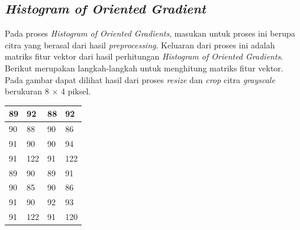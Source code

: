 \subsection{\textit{Histogram of Oriented Gradient}}
\noindent Pada proses \textit{Histogram of Oriented Gradients}, masukan untuk proses ini berupa citra yang berasal dari hasil \textit{preprocessing}. Keluaran dari proses ini adalah matriks fitur vektor dari hasil perhitungan \textit{Histogram of Oriented Gradients}. Berikut merupakan langkah-langkah untuk menghitung matriks fitur vektor. Pada gambar dapat dilihat hasil dari proses \textit{resize} dan \textit{crop} citra \textit{grayscale} berukuran 8 $\times$ 4 piksel.

\begin{table}[H]
	\centering
	\begin{small}
		\begin{tabular}{|p{2cm}|p{2cm}|p{2cm}|p{2cm}|}
			\hline
			89 & 92 & 88 & 92 \\
			\hline
			90 & 88 & 90 & 86 \\
			\hline
			91 & 90 & 90 & 94 \\
			\hline
			91 & 122 & 91 & 122 \\
			\hline
			89 & 90 & 89 & 91 \\
			\hline
			90 & 85 & 90 & 86 \\
			\hline
			91 & 90 & 92 & 93 \\
			\hline
			91 & 122 & 91 & 120 \\
			\hline
		\end{tabular}
	\end{small}
	\label{fig:MatriksCitraHasilPreprocessing}
\end{table}

